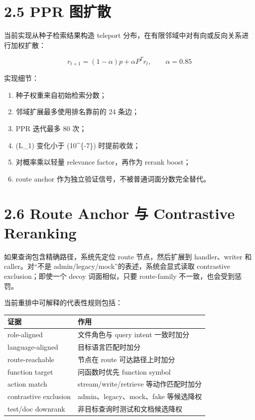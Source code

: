 \documentclass[UTF8,12pt,openany]{ctexbook}
\begin{document}
\section{2.5 PPR 图扩散}

当前实现从种子检索结果构造 teleport 分布，在有限邻域中对有向或反向关系进行加权扩散：\par

\[
r_{t+1}=(1-\alpha)p+\alpha P^Tr_t,\qquad \alpha=0.85
\]

实现细节：\par

\begin{enumerate}
\item 种子权重来自初始检索分数；
\item 邻域扩展最多使用排名靠前的 24 条边；
\item PPR 迭代最多 80 次；
\item (L\_1) 变化小于 (10\textasciicircum{}\{-7\}) 时提前收敛；
\item 对概率乘以轻量 relevance factor，再作为 rerank boost；
\item route anchor 作为独立验证信号，不被普通词面分数完全替代。
\end{enumerate}

\section{2.6 Route Anchor 与 Contrastive Reranking}

如果查询包含精确路径，系统先定位 route 节点，然后扩展到 handler、writer 和 caller。对“不是 admin/legacy/mock”的表述，系统会显式读取 contrastive exclusion；即使一个 decoy 词面相似，只要 route-family 不一致，也会受到惩罚。\par

当前重排中可解释的代表性规则包括：\par

\begin{center}
\small
\begin{longtable}{|p{}|p{}|}
\toprule
证据 & 作用 \\
\midrule
role-aligned & 文件角色与 query intent 一致时加分 \\
language-aligned & 目标语言匹配时加分 \\
route-reachable & 节点在 route 可达路径上时加分 \\
function target & 问函数时优先 function symbol \\
action match & stream/write/retrieve 等动作匹配时加分 \\
contrastive exclusion & admin、legacy、mock、fake 等候选降权 \\
test/doc downrank & 非目标查询时测试和文档候选降权 \\
\bottomrule
\end{longtable}
\end{center}
\end{document}
